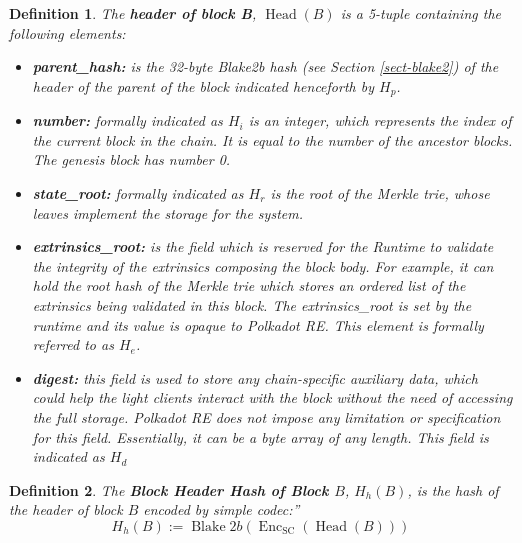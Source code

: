 \documentclass{book}
\newcommand{\assign}{:=}
\newcommand{\tmop}[1]{\ensuremath{\operatorname{#1}}}
\newcommand{\tmsamp}[1]{\textsf{#1}}
\newcommand{\tmstrong}[1]{\textbf{#1}}
\newcommand{\tmtextbf}[1]{{\bfseries{#1}}}
\newcommand{\tmtextsf}[1]{{\sffamily{#1}}}
\newtheorem{definition}{Definition}
\providecommand{\tmop}[1]{\ensuremath{\mathrm{#1}}}
\providecommand{\tmsamp}[1]{\tmtextsf{#1}}
\providecommand{\tmstrong}[1]{\tmtextbf{#1}}
\providecommand{\tmtextbf}[1]{\tmtextbf{#1}}
\newtheorem{definition}{Definition}
\begin{document}
\begin{definition}
  \label{defn-block-header}The {\tmstrong{header of block B}},
  {\tmstrong{$\tmop{Head} (B)$}} is a 5-tuple containing the following
  elements:
  \begin{itemize}
    \item \tmtextbf{{\tmsamp{parent\_hash:}}} is the 32-byte Blake2b hash (see
    Section \ref{sect-blake2}) of the header of the parent of the block
    indicated henceforth by \tmtextbf{$H_p$}.
    
    \item {\tmstrong{{\tmsamp{number:}}}} formally indicated as
    {\tmstrong{$H_i$}} is an integer, which represents the index of the
    current block in the chain. It is equal to the number of the ancestor
    blocks. The genesis block has number 0.
    
    \item {\tmstrong{{\tmsamp{state\_root:}}}} formally indicated as
    {\tmstrong{$H_r$}} is the root of the Merkle trie, whose leaves implement
    the storage for the system.
    
    \item {\tmstrong{{\tmsamp{extrinsics\_root:}}}} is the field which is
    reserved for the Runtime to validate the integrity of the extrinsics
    composing the block body. For example, it can hold the root hash of the
    Merkle trie which stores an ordered list of the extrinsics being validated
    in this block. The {\tmsamp{extrinsics\_root}} is set by the runtime and
    its value is opaque to Polkadot RE. This element is formally referred to
    as {\tmstrong{$H_e$}}.
    
    \item {\tmstrong{{\tmsamp{digest:}}}} this field is used to store any
    chain-specific auxiliary data, which could help the light clients interact
    with the block without the need of accessing the full storage. Polkadot RE
    does not impose any limitation or specification for this field.
    Essentially, it can be a byte array of any length. This field is indicated
    as {\tmstrong{$H_d$}}
  \end{itemize}
\end{definition}

\begin{definition}
  \label{defn-block-header-hash}The {\tmstrong{Block Header Hash of Block
  $B$}}, {\tmstrong{$H_h (B)$}}, is the hash of the header of block $B$
  encoded by simple codec:''
  \[ H_h (B) \assign \tmop{Blake} 2 b (\tmop{Enc}_{\tmop{SC}} (\tmop{Head}
     (B))) \]
\end{definition}
\end{document}
